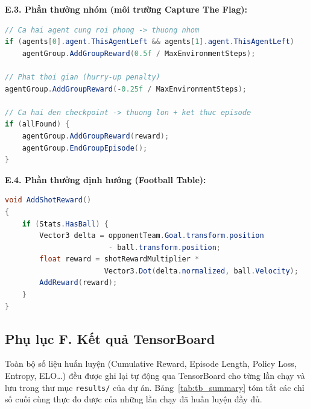 \noindent\textbf{E.3. Phần thưởng nhóm (môi trường Capture The Flag):}
\begin{lstlisting}[language=Java,caption={Group reward - EnvController.cs (trich doan)},captionpos=b]
// Ca hai agent cung roi phong -> thuong nhom
if (agents[0].agent.ThisAgentLeft && agents[1].agent.ThisAgentLeft)
    agentGroup.AddGroupReward(0.5f / MaxEnvironmentSteps);

// Phat thoi gian (hurry-up penalty)
agentGroup.AddGroupReward(-0.25f / MaxEnvironmentSteps);

// Ca hai den checkpoint -> thuong lon + ket thuc episode
if (allFound) {
    agentGroup.AddGroupReward(reward);
    agentGroup.EndGroupEpisode();
}
\end{lstlisting}

\noindent\textbf{E.4. Phần thưởng định hướng (Football Table):}
\begin{lstlisting}[language=Java,caption={AddShotReward - FootballAgent.cs},captionpos=b]
void AddShotReward()
{
    if (Stats.HasBall) {
        Vector3 delta = opponentTeam.Goal.transform.position
                        - ball.transform.position;
        float reward = shotRewardMultiplier *
                       Vector3.Dot(delta.normalized, ball.Velocity);
        AddReward(reward);
    }
}
\end{lstlisting}

\subsection*{Phụ lục F. Kết quả TensorBoard}

Toàn bộ số liệu huấn luyện (Cumulative Reward, Episode Length, Policy Loss, Entropy,
ELO\ldots) đều được ghi lại tự động qua TensorBoard cho từng lần chạy và lưu trong
thư mục \texttt{results/} của dự án. Bảng~\ref{tab:tb_summary} tóm tắt các chỉ số
cuối cùng thực đo được của những lần chạy đã huấn luyện đầy đủ.

